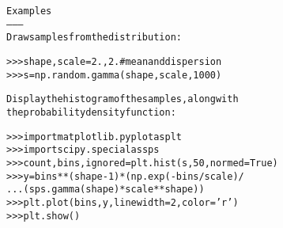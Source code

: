 \begin{boxedminipage}{\funcwidth}
\begin{alltt}
Examples
--------
Draw samples from the distribution:

{\textgreater}{\textgreater}{\textgreater} shape, scale = 2., 2. \# mean and dispersion
{\textgreater}{\textgreater}{\textgreater} s = np.random.gamma(shape, scale, 1000)

Display the histogram of the samples, along with
the probability density function:

{\textgreater}{\textgreater}{\textgreater} import matplotlib.pyplot as plt
{\textgreater}{\textgreater}{\textgreater} import scipy.special as sps
{\textgreater}{\textgreater}{\textgreater} count, bins, ignored = plt.hist(s, 50, normed=True)
{\textgreater}{\textgreater}{\textgreater} y = bins**(shape-1)*(np.exp(-bins/scale) /
...                      (sps.gamma(shape)*scale**shape))
{\textgreater}{\textgreater}{\textgreater} plt.plot(bins, y, linewidth=2, color='r')
{\textgreater}{\textgreater}{\textgreater} plt.show()
\end{alltt}

\setlength{\parskip}{1ex}
    \end{boxedminipage}

    \label{QSTK:qstklearn:mldiagnostics:geometric}

    \vspace{0.5ex}

